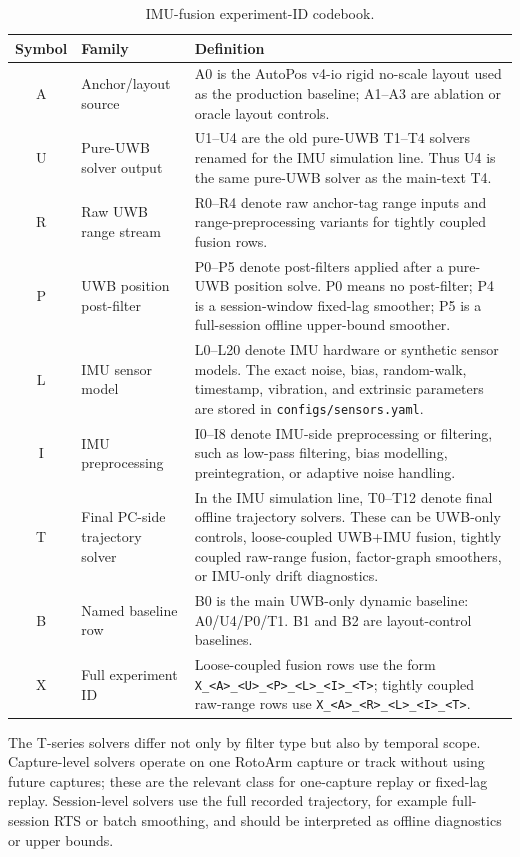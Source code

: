 \documentclass[11pt,a4paper]{article}
\begin{document}
\begin{table}[H]
\centering
\caption{IMU-fusion experiment-ID codebook.}
\label{tab:app_imu_codebook_families}
\small
\begin{tabularx}{\textwidth}{c >{\raggedright\arraybackslash}p{3.1cm} X}
\toprule
{Symbol} & {Family} & {Definition} \\
\midrule
A & Anchor/layout source & A0 is the AutoPos v4-io rigid no-scale layout used as the production baseline; A1--A3 are ablation or oracle layout controls. \\
U & Pure-UWB solver output & U1--U4 are the old pure-UWB T1--T4 solvers renamed for the IMU simulation line. Thus U4 is the same pure-UWB solver as the main-text T4. \\
R & Raw UWB range stream & R0--R4 denote raw anchor-tag range inputs and range-preprocessing variants for tightly coupled fusion rows. \\
P & UWB position post-filter & P0--P5 denote post-filters applied after a pure-UWB position solve. P0 means no post-filter; P4 is a session-window fixed-lag smoother; P5 is a full-session offline upper-bound smoother. \\
L & IMU sensor model & L0--L20 denote IMU hardware or synthetic sensor models. The exact noise, bias, random-walk, timestamp, vibration, and extrinsic parameters are stored in \texttt{configs/sensors.yaml}. \\
I & IMU preprocessing & I0--I8 denote IMU-side preprocessing or filtering, such as low-pass filtering, bias modelling, preintegration, or adaptive noise handling. \\
T & Final PC-side trajectory solver & In the IMU simulation line, T0--T12 denote final offline trajectory solvers. These can be UWB-only controls, loose-coupled UWB+IMU fusion, tightly coupled raw-range fusion, factor-graph smoothers, or IMU-only drift diagnostics. \\
B & Named baseline row & B0 is the main UWB-only dynamic baseline: A0/U4/P0/T1. B1 and B2 are layout-control baselines. \\
X & Full experiment ID & Loose-coupled fusion rows use the form \texttt{X\_<A>\_<U>\_<P>\_<L>\_<I>\_<T>}; tightly coupled raw-range rows use \texttt{X\_<A>\_<R>\_<L>\_<I>\_<T>}. \\
\bottomrule
\end{tabularx}
\end{table}

The T-series solvers differ not only by filter type but also by temporal scope.
Capture-level solvers operate on one RotoArm capture or track without using future captures; these are the relevant class for one-capture replay or fixed-lag replay.
Session-level solvers use the full recorded trajectory, for example full-session RTS or batch smoothing, and should be interpreted as offline diagnostics or upper bounds.
\end{document}
